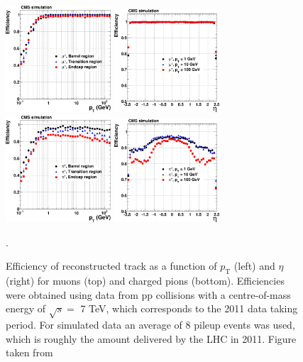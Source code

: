 \begin{figure}[ht]
  \begin{center}
    \includegraphics[width=0.35\textwidth]{figuras/Chapter3/TrackEff_Muon_pt.png}
    \includegraphics[width=0.35\textwidth]{figuras/Chapter3/TrackEff_Muon_eta.png}
    \includegraphics[width=0.35\textwidth]{figuras/Chapter3/TrackEff_Pion_pt.png}
    \includegraphics[width=0.35\textwidth]{figuras/Chapter3/TrackEff_Pion_eta.png}
    \caption{Efficiency of reconstructed track as a function of $p_{\textrm{T}}$ (left) and $\eta$ (right) for 
    muons (top) and charged pions (bottom). Efficiencies were obtained using data from pp collisions with a centre-of-mass 
    energy of $\sqrt{s} =$  7 TeV, which corresponds to the 2011 data taking period. For simulated data an average of 8 pileup 
    events was used, which is roughly the amount delivered by the LHC in 2011. Figure taken from \cite{Chatrchyan:2014fea}}.
    \label{fig:Track_Efficiencies}
  \end{center}
\end{figure}

